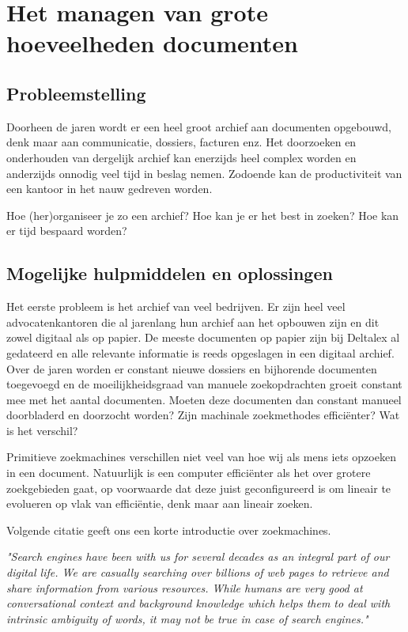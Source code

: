 \newpage


\section{Het managen van grote hoeveelheden documenten}
\subsection{Probleemstelling}
Doorheen de jaren wordt er een heel groot archief aan documenten opgebouwd, denk maar aan communicatie, dossiers, facturen enz.
Het doorzoeken en onderhouden van dergelijk archief kan enerzijds heel complex worden en anderzijds onnodig veel tijd in beslag nemen.
Zodoende kan de productiviteit van een kantoor in het nauw gedreven worden.

Hoe (her)organiseer je zo een archief? Hoe kan je er het best in zoeken? Hoe kan er tijd bespaard worden?

\subsection{Mogelijke hulpmiddelen en oplossingen}
Het eerste probleem is het archief van veel bedrijven.
Er zijn heel veel advocatenkantoren die al jarenlang hun archief aan het opbouwen zijn en dit zowel digitaal als op papier.
De meeste documenten op papier zijn bij Deltalex al gedateerd en alle relevante informatie is reeds opgeslagen in een digitaal archief.
Over de jaren worden er constant nieuwe dossiers en bijhorende documenten toegevoegd en de moeilijkheidsgraad van manuele zoekopdrachten groeit constant mee met het aantal documenten.
Moeten deze documenten dan constant manueel doorbladerd en doorzocht worden?
Zijn machinale zoekmethodes efficiënter? Wat is het verschil?

Primitieve zoekmachines verschillen niet veel van hoe wij als mens iets opzoeken in een document.
Natuurlijk is een computer efficiënter als het over grotere zoekgebieden gaat, op voorwaarde dat deze juist geconfigureerd is om lineair te evolueren op vlak van efficiëntie, denk maar aan lineair zoeken.

Volgende citatie geeft ons een korte introductie over zoekmachines.

\begin{displayquote}
	\textit{"Search engines have been with us for several decades as an integral part of our digital life.
		We are casually searching over billions of web pages to retrieve and share information from various resources.
		While humans are very good at conversational context and background knowledge which helps them to deal with intrinsic ambiguity of words,
		it may not be true in case of search engines."} \autocite{MediumSemanticSearch}
\end{displayquote}

